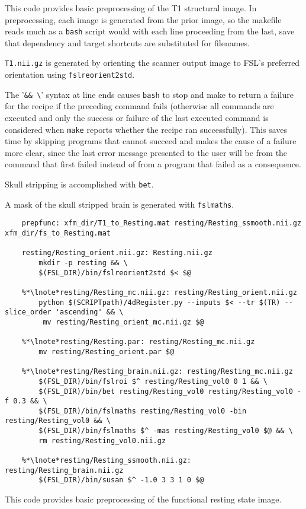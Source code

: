 This code provides basic preprocessing of the T1 structural image. In preprocessing, each image is generated from the prior image, so the makefile reads much as a \texttt{bash} script would with each line proceeding from the last, save that dependency and target shortcuts are substituted for filenames.

\texttt{T1.nii.gz} is generated by orienting the scanner output image to FSL's preferred orientation using \texttt{fslreorient2std}.

The '\texttt{\&\& \textbackslash}' syntax at line ends causes \texttt{bash} to stop and make to return a failure for the recipe if the preceding command fails (otherwise all commands are executed and only the success or failure of the last executed command is considered when \texttt{make} reports whether the recipe ran successfully). This saves time by skipping programs that cannot succeed and makes the cause of a failure more clear, since the last error message presented to the user will be from the command that first failed instead of from a program that failed as a consequence.

Skull stripping is accomplished with \texttt{bet}.

A mask of the skull stripped brain is generated with \texttt{fslmaths}.

\begin{lstlisting}
	prepfunc: xfm_dir/T1_to_Resting.mat resting/Resting_ssmooth.nii.gz xfm_dir/fs_to_Resting.mat
	
	resting/Resting_orient.nii.gz: Resting.nii.gz
		mkdir -p resting && \
		$(FSL_DIR)/bin/fslreorient2std $< $@

	%*\lnote*resting/Resting_mc.nii.gz: resting/Resting_orient.nii.gz
		python $(SCRIPTpath)/4dRegister.py --inputs $< --tr $(TR) --slice_order 'ascending' && \
		 mv resting/Resting_orient_mc.nii.gz $@
	
	%*\lnote*resting/Resting.par: resting/Resting_mc.nii.gz
		mv resting/Resting_orient.par $@

	%*\lnote*resting/Resting_brain.nii.gz: resting/Resting_mc.nii.gz
		$(FSL_DIR)/bin/fslroi $^ resting/Resting_vol0 0 1 && \
		$(FSL_DIR)/bin/bet resting/Resting_vol0 resting/Resting_vol0 -f 0.3 && \
		$(FSL_DIR)/bin/fslmaths resting/Resting_vol0 -bin resting/Resting_vol0 && \
		$(FSL_DIR)/bin/fslmaths $^ -mas resting/Resting_vol0 $@ && \
		rm resting/Resting_vol0.nii.gz

	%*\lnote*resting/Resting_ssmooth.nii.gz: resting/Resting_brain.nii.gz
		$(FSL_DIR)/bin/susan $^ -1.0 3 3 1 0 $@	
\end{lstlisting}
This code provides basic preprocessing of the functional resting state image.

